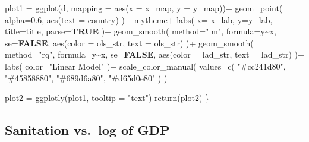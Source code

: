 \documentclass[
]{article}
\newenvironment{Shaded}{}{}
\newcommand{\AttributeTok}[1]{\textcolor[rgb]{0.84,0.60,0.13}{#1}}
\newcommand{\ConstantTok}[1]{\textcolor[rgb]{0.69,0.38,0.53}{\textbf{#1}}}
\newcommand{\FloatTok}[1]{\textcolor[rgb]{0.96,0.45,0.00}{#1}}
\newcommand{\FunctionTok}[1]{\textcolor[rgb]{0.41,0.62,0.42}{#1}}
\newcommand{\NormalTok}[1]{\textcolor[rgb]{0.24,0.22,0.21}{#1}}
\newcommand{\OtherTok}[1]{\textcolor[rgb]{0.41,0.62,0.42}{#1}}
\newcommand{\SpecialCharTok}[1]{\textcolor[rgb]{0.69,0.38,0.53}{#1}}
\newcommand{\StringTok}[1]{\textcolor[rgb]{0.60,0.59,0.10}{#1}}
\begin{document}
\begin{Shaded}
\begin{Highlighting}[]
\NormalTok{  plot1 }\OtherTok{=} \FunctionTok{ggplot}\NormalTok{(d, }\AttributeTok{mapping =} \FunctionTok{aes}\NormalTok{(}\AttributeTok{x =}\NormalTok{ x\_map, }\AttributeTok{y =}\NormalTok{ y\_map))}\SpecialCharTok{+}
    \FunctionTok{geom\_point}\NormalTok{(}
      \AttributeTok{alpha=}\FloatTok{0.6}\NormalTok{,}
      \FunctionTok{aes}\NormalTok{(}\AttributeTok{text =}\NormalTok{ country)}
\NormalTok{    )}\SpecialCharTok{+}
\NormalTok{    mytheme}\SpecialCharTok{+}
    \FunctionTok{labs}\NormalTok{(}
      \AttributeTok{x=}\NormalTok{ x\_lab,}
      \AttributeTok{y=}\NormalTok{y\_lab,}
      \AttributeTok{title=}\NormalTok{title,}
      \AttributeTok{parse=}\ConstantTok{TRUE}
\NormalTok{    )}\SpecialCharTok{+}
    \FunctionTok{geom\_smooth}\NormalTok{(}
      \AttributeTok{method=}\StringTok{"lm"}\NormalTok{,}
      \AttributeTok{formula=}\NormalTok{y}\SpecialCharTok{\textasciitilde{}}\NormalTok{x,}
      \AttributeTok{se=}\ConstantTok{FALSE}\NormalTok{,}
      \FunctionTok{aes}\NormalTok{(}\AttributeTok{color =}\NormalTok{ ols\_str, }\AttributeTok{text =}\NormalTok{ ols\_str)}
\NormalTok{    )}\SpecialCharTok{+}
    \FunctionTok{geom\_smooth}\NormalTok{(}
      \AttributeTok{method=}\StringTok{"rq"}\NormalTok{,}
      \AttributeTok{formula=}\NormalTok{y}\SpecialCharTok{\textasciitilde{}}\NormalTok{x,}
      \AttributeTok{se=}\ConstantTok{FALSE}\NormalTok{,}
      \FunctionTok{aes}\NormalTok{(}\AttributeTok{color =}\NormalTok{ lad\_str, }\AttributeTok{text =}\NormalTok{ lad\_str)}
\NormalTok{    )}\SpecialCharTok{+}
    \FunctionTok{labs}\NormalTok{(}
      \AttributeTok{color=}\StringTok{"Linear Model"}
\NormalTok{    )}\SpecialCharTok{+}
    \FunctionTok{scale\_color\_manual}\NormalTok{(}
      \AttributeTok{values=}\FunctionTok{c}\NormalTok{(}
        \StringTok{"\#cc241d80"}\NormalTok{,}
        \StringTok{"\#45858880"}\NormalTok{,}
        \StringTok{"\#689d6a80"}\NormalTok{,}
        \StringTok{"\#d65d0e80"}
\NormalTok{        )}
\NormalTok{    )}
  
\NormalTok{  plot2 }\OtherTok{=} \FunctionTok{ggplotly}\NormalTok{(plot1, }\AttributeTok{tooltip =} \StringTok{"text"}\NormalTok{)}
  \FunctionTok{return}\NormalTok{(plot2)}
\NormalTok{\}}
\end{Highlighting}
\end{Shaded}

\hypertarget{sanitation-vs.-log-of-gdp-1}{%
\subsection{Sanitation vs.~log of
GDP}\label{sanitation-vs.-log-of-gdp-1}}
\end{document}
